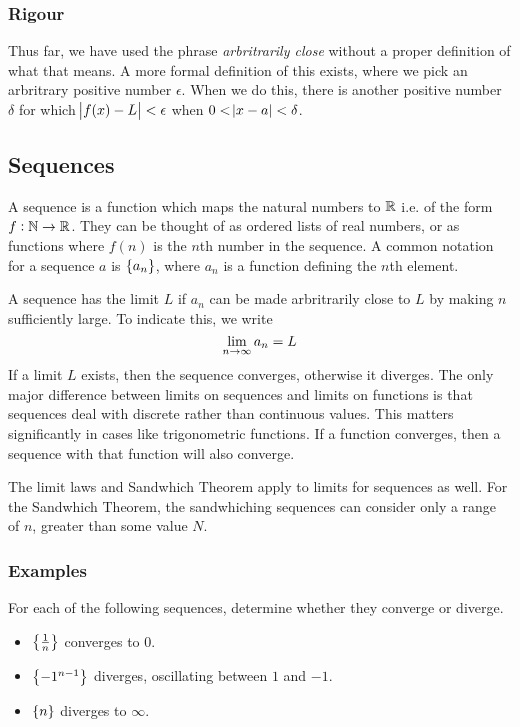 \documentclass[12pt]{report}
\begin{document}
\begin{flushleft}
\subsubsection*{Rigour}
Thus far, we have used the phrase \textit{arbritrarily close} without a proper
definition of what that means. A more formal definition of this exists, where
we pick an arbritrary positive number \(\epsilon\). When we do this, there is
another positive number \(\delta\) for which \(\abs{f(x) - L} < \epsilon\) when
\(0 < \abs{x - a} < \delta\).

\subsection*{Sequences}
A sequence is a function which maps the natural numbers to \(\mathbb{R}\) i.e. of the
form \(f: \mathbb{N} \rightarrow \mathbb{R}\). They can be thought of as ordered lists of real
numbers, or as functions where \(f(n)\) is the \(n\)th number in the sequence.
A common notation for a sequence \(a\) is \(\set{a_n}\), where \(a_n\) is a 
function defining the \(n\)th element. \par
A sequence has the limit \(L\) if \(a_n\) can be made arbritrarily close to 
\(L\) by making \(n\) sufficiently large. To indicate this, we write
\[\lim\limits_{n\rightarrow\infty} a_n = L\]
If a limit \(L\) exists, then the sequence converges, otherwise it diverges.
The only major difference between limits on sequences and limits on functions
is that sequences deal with discrete rather than continuous values. This 
matters significantly in cases like trigonometric functions. If a function
converges, then a sequence with that function will also converge. \par
The limit laws and Sandwhich Theorem apply to limits for sequences as well.
For the Sandwhich Theorem, the sandwhiching sequences can consider only a range
of \(n\), greater than some value \(N\).

\subsubsection*{Examples}
For each of the following sequences, determine whether they converge or 
diverge.
\begin{itemize}
    \item \(\set{\frac{1}{n}}\) converges to \(0\).
    \item \(\set{-1^{n - 1}}\) diverges, oscillating between \(1\) and \(-1\).
    \item \(\set{n}\) diverges to \(\infty\).
\end{itemize}


\end{flushleft}
\end{document}
